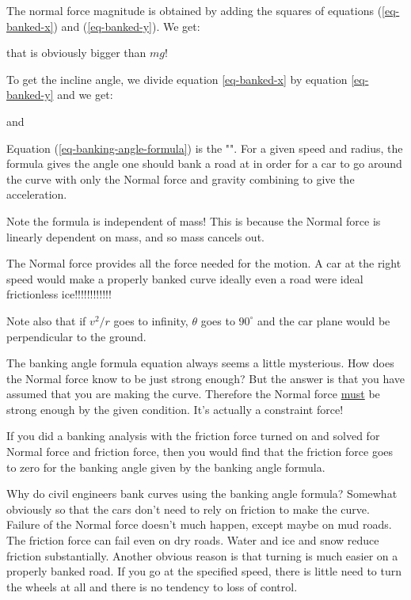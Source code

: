     The normal force magnitude is obtained by adding the squares
of  equations (\ref{eq-banked-x}) and (\ref{eq-banked-y}). We get:
	
    that is obviously bigger than $mg$!
 
    To get the incline angle, we divide equation \ref{eq-banked-x} by equation \ref{eq-banked-y} and we get:
    
	and
	
	Equation (\ref{eq-banking-angle-formula}) is the "". For a given speed and radius, the formula gives the angle one should bank a road at in order for a car to go around the curve with only the Normal force and gravity combining to give the acceleration.

      Note the formula is independent of mass! This is because the Normal force is linearly dependent on mass, and so mass cancels out.

    The Normal force provides all the force needed for the motion.
A car at the right speed would make a properly banked curve ideally even a road were ideal frictionless ice!!!!!!!!!!!!

    Note also that if $v^{2}/r$ goes to infinity, $\theta$ goes to $90^{\circ}$ and the car plane would be perpendicular to the ground.


	The banking angle formula equation always seems a little mysterious. How does the Normal force know to be just strong enough? But the answer is that you have assumed that you are making the curve. Therefore the Normal force \underline{must} be strong enough by the given condition. It's actually a constraint force!

    If you did a banking analysis with the friction force turned on and solved for Normal force and friction force, then you would find that the friction force goes to zero for the banking angle given by
the banking angle formula.

      Why do civil engineers bank curves using the banking angle formula? Somewhat obviously so that the cars don't need to rely on friction to make the curve. Failure of the Normal force doesn't much happen, except maybe on mud roads. The friction force can fail even on dry roads. Water and ice and snow reduce friction substantially.      Another obvious reason is that turning is much easier on a properly banked road. If you go at the specified speed, there is little need to turn the wheels at all and there is no tendency to loss of control.

